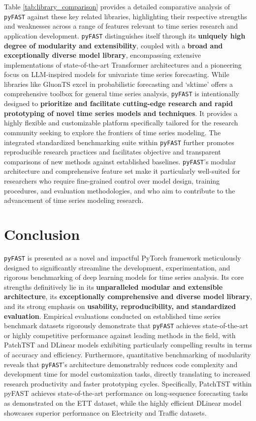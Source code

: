 \documentclass[twoside,11pt]{article}
\begin{document}
Table \ref{tab:library_comparison} provides a detailed comparative analysis of \texttt{pyFAST} against these key related libraries, highlighting their respective strengths and weaknesses across a range of features relevant to time series research and application development.  \texttt{pyFAST} distinguishes itself through its \textbf{uniquely high degree of modularity and extensibility}, coupled with a \textbf{broad and exceptionally diverse model library}, encompassing extensive implementations of state-of-the-art Transformer architectures and a pioneering focus on LLM-inspired models for univariate time series forecasting.  While libraries like GluonTS excel in probabilistic forecasting and `sktime' offers a comprehensive toolbox for general time series analysis, \texttt{pyFAST} is intentionally designed to \textbf{prioritize and facilitate cutting-edge research and rapid prototyping of novel time series models and techniques}.  It provides a highly flexible and customizable platform specifically tailored for the research community seeking to explore the frontiers of time series modeling.  The integrated standardized benchmarking suite within \texttt{pyFAST} further promotes reproducible research practices and facilitates objective and transparent comparisons of new methods against established baselines.  \texttt{pyFAST}'s modular architecture and comprehensive feature set make it particularly well-suited for researchers who require fine-grained control over model design, training procedures, and evaluation methodologies, and who aim to contribute to the advancement of time series modeling research.

\section{Conclusion}

\texttt{pyFAST} is presented as a novel and impactful PyTorch framework meticulously designed to significantly streamline the development, experimentation, and rigorous benchmarking of deep learning models for time series analysis.  Its core strengths definitively lie in its \textbf{unparalleled modular and extensible architecture}, its \textbf{exceptionally comprehensive and diverse model library}, and its strong emphasis on \textbf{usability, reproducibility, and standardized evaluation}.  Empirical evaluations conducted on established time series benchmark datasets rigorously demonstrate that \texttt{pyFAST} achieves state-of-the-art or highly competitive performance against leading methods in the field, with PatchTST and DLinear models exhibiting particularly compelling results in terms of accuracy and efficiency.  Furthermore, quantitative benchmarking of modularity reveals that \texttt{pyFAST}'s architecture demonstrably reduces code complexity and development time for model customization tasks, directly translating to increased research productivity and faster prototyping cycles.  Specifically, PatchTST within pyFAST achieves state-of-the-art performance on long-sequence forecasting tasks as demonstrated on the ETT dataset, while the highly efficient DLinear model showcases superior performance on Electricity and Traffic datasets.
\end{document}
